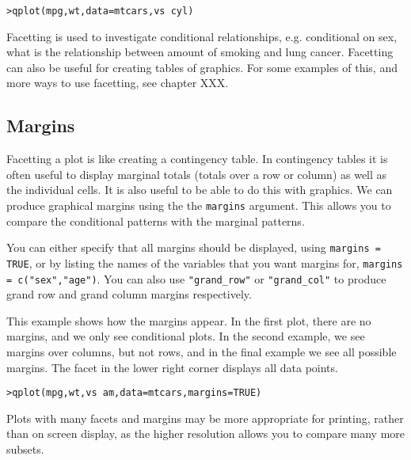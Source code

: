 \begin{alltt}
> qplot(mpg, wt, data = mtcars, vs ~ cyl)
\end{alltt}
\begin{alltt}

\end{alltt}

Facetting is used to investigate conditional relationships, e.g. conditional on sex, what is the relationship between amount of smoking and lung cancer.  Facetting can also be useful for creating tables of graphics.  For some examples of this, and more ways to use facetting, see chapter XXX.

\subsection{Margins}\label{sub:margins}

Facetting a plot is like creating a contingency table.  In contingency tables it is often useful to display marginal totals (totals over a row or column) as well as the individual cells.  It is also useful to be able to do this with graphics.  We can produce graphical margins using the the {\tt margins} argument.  This allows you to compare the conditional patterns with the marginal patterns.

You can either specify that all margins should be displayed, using {\tt margins = TRUE}, or by listing the names of the variables that you want margins for, {\tt margins = c("sex","age")}.  You can also use \verb|"grand_row"| or \verb|"grand_col"| to produce grand row and grand column margins respectively.

This example shows how the margins appear.  In the first plot, there are no margins, and we only see conditional plots.  In the second example, we see margins over columns, but not rows, and in the final example we see all possible margins.  The facet in the lower right corner displays all data points.

\begin{alltt}
> qplot(mpg, wt, vs ~ am, data = mtcars, margins = TRUE)
\end{alltt}
\begin{alltt}

\end{alltt}

Plots with many facets and margins may be more appropriate for printing, rather than on screen display, as the higher resolution allows you to compare many more subsets.

